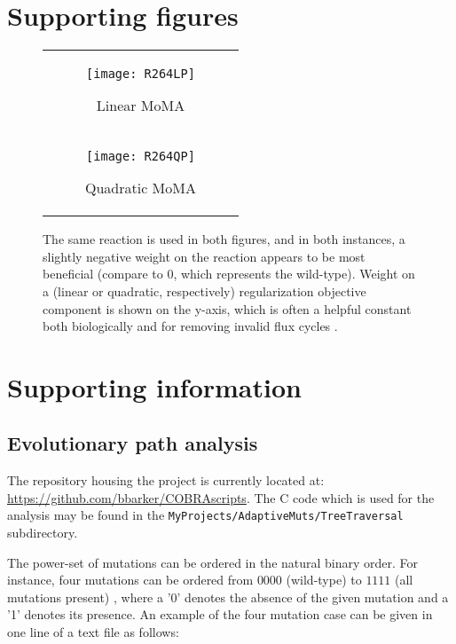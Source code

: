 \section{Supporting figures}

\begin{figure}[H]
\centering
\begin{tabular}{c}
\begin{subfigure}[b]{\textwidth}
  \texttt{[image: R264LP]}
  \caption{Linear MoMA} 
  \label{fig:R264LP}
\end{subfigure}
\\
\begin{subfigure}[b]{\textwidth}
  \texttt{[image: R264QP]}
  \caption{Quadratic MoMA} 
  \label{fig:R264QP}
\end{subfigure}
\\
\end{tabular}
\caption{The same reaction is used in both figures, and in both
instances, a slightly negative weight on the reaction appears to be
most beneficial (compare to 0, which represents the wild-type).
Weight on a (linear or quadratic, respectively) 
regularization objective component is shown on the y-axis, which is often a helpful
constant both biologically and for removing invalid flux cycles 
\citep{Schuetz2012, Smallbone2009a}.}
\label{fig:wMoMA_smoothness}
\end{figure}

\section{Supporting information}

\subsection{Evolutionary path analysis}
\label{sec:pathAnalysis}

The repository housing the project is currently located at:
\url{https://github.com/bbarker/COBRAscripts}. The C code which is
used for the analysis may be found in the
\texttt{MyProjects/AdaptiveMuts/TreeTraversal} subdirectory. 


%
%

The power-set of mutations can be ordered in the natural binary order.
For instance, four mutations can be ordered from $0000$ (wild-type) to
$1111$ (all mutations present) , where a '0' denotes the absence of
the given mutation and a '1' denotes its presence. An example of the
four mutation case can be given in one line of a text file as follows:

